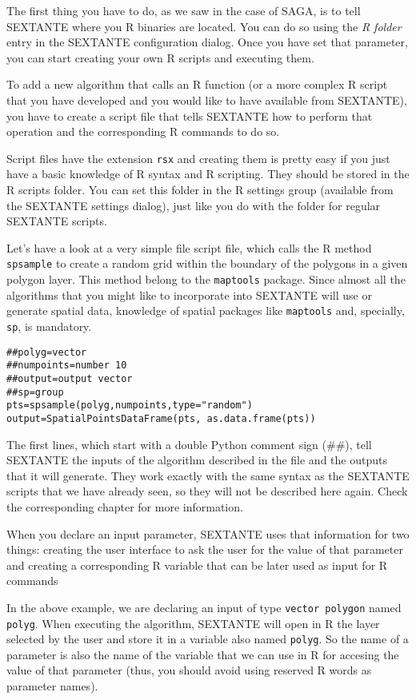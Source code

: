 The first thing you have to do, as we saw in the case of SAGA, is to tell SEXTANTE where you R binaries are located. You can do so using the \emph{R folder} entry in the SEXTANTE configuration dialog. Once you have set that parameter, you can start creating your own R scripts and executing them.

To add a new algorithm that calls an R function (or a more complex R script that you have developed and you would like to have available from SEXTANTE), you have to create a script file that tells SEXTANTE how to perform that operation and the corresponding R commands to do so.

Script files have the extension \texttt{rsx} and creating them is pretty easy if you just have a basic knowledge of R syntax and R scripting. They should be stored in the R scripts folder. You can set this folder in the R settings group (available from the SEXTANTE settings dialog), just like you do with the folder for regular SEXTANTE scripts. 

Let's have a look at a very simple file script file, which calls the R method \texttt{spsample} to create a random grid within the boundary of the polygons in a given polygon layer. This method belong to the \texttt{maptools} package. Since almost all the algorithms that you might like to incorporate into SEXTANTE will use or generate spatial data, knowledge of spatial packages like \texttt{maptools} and, specially, \texttt{sp}, is mandatory.

\begin{verbatim}
##polyg=vector
##numpoints=number 10
##output=output vector
##sp=group
pts=spsample(polyg,numpoints,type="random")
output=SpatialPointsDataFrame(pts, as.data.frame(pts))
\end{verbatim}


The first lines, which start with a double Python comment sign (\#\#), tell SEXTANTE the inputs of the algorithm described in the file and the outputs that it will generate. They work exactly with the same syntax as the SEXTANTE scripts that we have already seen, so they will not be described here again. Check the corresponding chapter for more information.

When you declare an input parameter, SEXTANTE uses that information for two things: creating the user interface to ask the user for the value of that parameter and creating a corresponding R variable that can be later used as input for R commands

In the above example, we are declaring an input of type \texttt{vector polygon} named \texttt{polyg}. When executing the algorithm, SEXTANTE will open in R the layer selected by the user and store it in a variable also named \texttt{polyg}. So the name of a parameter is also the name of the variable that we can use in R for accesing the value of that parameter (thus, you should avoid using reserved R words as parameter names).

